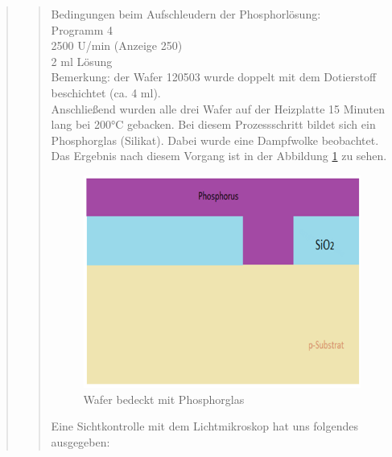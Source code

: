 \begin{quote}
\begin{quote}
		Bedingungen beim Aufschleudern der Phosphorlösung:\\
		Programm 4\\
		2500 U/min (Anzeige 250)\\
		2 ml Lösung\\

		Bemerkung: der Wafer 120503 wurde doppelt mit dem Dotierstoff 
		beschichtet (ca. 4 ml).\\
		Anschließend wurden alle drei Wafer auf der Heizplatte  15 Minuten lang 
		bei 200°C gebacken. Bei diesem Prozessschritt bildet sich ein 
		Phosphorglas (Silikat). Dabei wurde eine Dampfwolke beobachtet. \\
		Das Ergebnis nach diesem Vorgang ist in der Abbildung \ref{fig:Waf_phos}  
		zu sehen.\\   
    
        \vspace{2em}
            
    		\begin{figure}[H]
				\hspace{4.7 cm}
                \includegraphics[scale=0.5, trim = 0cm 0cm 0cm 0cm,clip]
                	{./HerstellungBilder/StrukturmitPhosphorus.png}
                  \caption{Wafer bedeckt mit Phosphorglas}
                \label{fig:Waf_phos}
            \end{figure}
            
        \vspace{2em}
            
		Eine Sichtkontrolle mit dem Lichtmikroskop hat uns folgendes ausgegeben:
         

\end{quote}
\end{quote}

